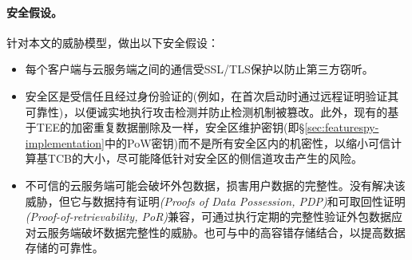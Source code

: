 \paragraph*{安全假设。}针对本文的威胁模型，做出以下安全假设：
\begin{itemize}
    \item 每个客户端与云服务端之间的通信受SSL/TLS保护以防止第三方窃听。
    \item 安全区是受信任且经过身份验证的(例如，在首次启动时通过远程证明验证其可靠性)，以便诚实地执行攻击检测并防止检测机制被篡改。此外，现有的基于TEE的加密重复数据删除\cite{shinde20}及\sysnameS 一样，安全区维护密钥(即\S\ref{sec:featurespy-implementation}中的PoW密钥)而不是所有安全区内的机密性，以缩小可信计算基TCB的大小，尽可能降低针对安全区的侧信道攻击产生的风险\cite{fei21}。
    \item 不可信的云服务端可能会破坏外包数据，损害用户数据的完整性。\sysnameF 没有解决该威胁，但它与数据持有证明\textit{(Proofs of Data Possession, PDP)}\cite{ateniese2007provable}和可取回性证明\textit{(Proof-of-retrievability, PoR)}\cite{juels2007pors}兼容，可通过执行定期的完整性验证外包数据应对云服务端破坏数据完整性的威胁。\sysnameF 也可与\cite{li15}中的高容错存储结合，以提高数据存储的可靠性。
\end{itemize}